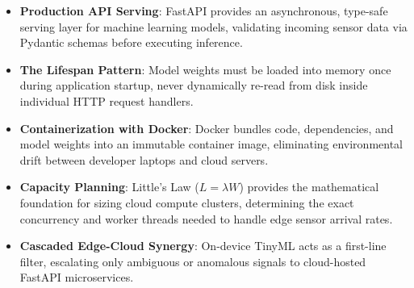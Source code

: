 \begin{takeaways}
\begin{itemize}
    \item \textbf{Production API Serving}: FastAPI provides an asynchronous, type-safe serving layer for machine learning models, validating incoming sensor data via Pydantic schemas before executing inference.
    \item \textbf{The Lifespan Pattern}: Model weights must be loaded into memory once during application startup, never dynamically re-read from disk inside individual HTTP request handlers.
    \item \textbf{Containerization with Docker}: Docker bundles code, dependencies, and model weights into an immutable container image, eliminating environmental drift between developer laptops and cloud servers.
    \item \textbf{Capacity Planning}: Little's Law ($L = \lambda W$) provides the mathematical foundation for sizing cloud compute clusters, determining the exact concurrency and worker threads needed to handle edge sensor arrival rates.
    \item \textbf{Cascaded Edge-Cloud Synergy}: On-device TinyML acts as a first-line filter, escalating only ambiguous or anomalous signals to cloud-hosted FastAPI microservices.
\end{itemize}
\end{takeaways}

